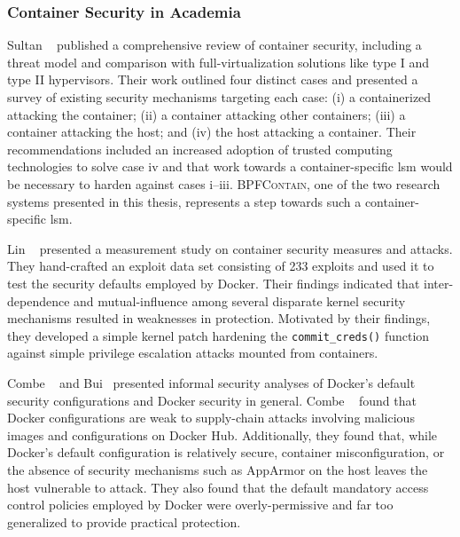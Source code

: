 \documentclass[
  fontsize=12pt,
  titlepage=firstiscover,
  paper=letter,
oneside,
  cleardoublepage=plain,
  parskip=half-,
  DIV=10,
  parindent,
  appendixprefix,
  chapterprefix,
  listof=totoc,
]{scrbook}
\newcommand{\bpfcontain}{\textsc{BPFContain}}
\begin{document}
\subsubsection{Container Security in Academia}\label{sss:container-security-academia}

Sultan \etal~\cite{sultan2019_container_security} published a comprehensive review of
container security, including a threat model and comparison with full-virtualization
solutions like type I and type II hypervisors. Their work outlined four distinct cases and
presented a survey of existing security mechanisms targeting each case: (i)
a containerized attacking the container; (ii) a container attacking other containers;
(iii) a container attacking the host; and (iv) the host attacking a container. Their
recommendations included an increased adoption of trusted computing technologies to solve
case iv and that work towards a container-specific \gls{lsm} would be necessary to harden
against cases i--iii. \bpfcontain{}, one of the two research systems presented in this thesis,
represents a step towards such a container-specific \gls{lsm}.

Lin \etal~\cite{lin2018_container_security} presented a measurement study on container
security measures and attacks. They hand-crafted an exploit data set consisting of 233
exploits and used it to test the security defaults employed by Docker. Their findings
indicated that inter-dependence and mutual-influence among several disparate kernel
security mechanisms resulted in weaknesses in protection. Motivated by their findings,
they developed a simple kernel patch hardening the \texttt{commit\_creds()} function
against simple privilege escalation attacks mounted from containers.

Combe \etal~\cite{combe2016_to_docker} and Bui~\cite{bui2015_docker_analysis} presented
informal security analyses of Docker's default security configurations and Docker security
in general. Combe \etal~\cite{combe2016_to_docker} found that Docker configurations are
weak to supply-chain attacks involving malicious images and configurations on Docker Hub.
Additionally, they found that, while Docker's default configuration is relatively secure,
container misconfiguration, or the absence of security mechanisms such as AppArmor on the
host leaves the host vulnerable to attack. They also found that the default mandatory
access control policies employed by Docker were overly-permissive and far too generalized
to provide practical protection.
\end{document}
